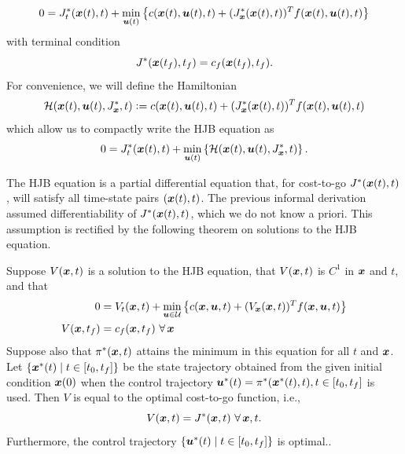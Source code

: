 \begin{equation}
    0 = J^*_t(\bm{x}(t),t) + \min_{\bm{u}(t)} \left\{ c(\bm{x}(t),\bm{u}(t),t) + (J_{\bm{x}}^*(\bm{x}(t),t))^T f(\bm{x}(t),\bm{u}(t),t) \right\}
\end{equation}
with terminal condition
\begin{equation}
    J^*(\bm{x}(t_f),t_f) = c_f(\bm{x}(t_f),t_f).
\end{equation}
For convenience, we will define the Hamiltonian 
\begin{equation}
    \mathcal{H}(\bm{x}(t),\bm{u}(t),J^*_{\bm{x}},t) \vcentcolon= c(\bm{x}(t),\bm{u}(t),t) + (J_{\bm{x}}^*(\bm{x}(t),t))^T f(\bm{x}(t),\bm{u}(t),t)
\end{equation}
which allow us to compactly write the HJB equation as 
\begin{equation}
    0 = J^*_t(\bm{x}(t),t) + \min_{\bm{u}(t)} \left\{ \mathcal{H}(\bm{x}(t),\bm{u}(t),J^*_{\bm{x}},t) \right\}.
\end{equation}

The HJB equation is a partial differential equation that, for cost-to-go $J^*(\bm{x}(t),t)$, will satisfy all time-state pairs $(\bm{x}(t),t)$. The previous informal derivation assumed differentiability of $J^*(\bm{x}(t),t)$, which we do not know a priori. This assumption is rectified by the following theorem on solutions to the HJB equation. 

\begin{theorem}
Suppose $V(\bm{x},t)$ is a solution to the HJB equation, that $V(\bm{x},t)$ is $C^1$ in $\bm{x}$ and $t$, and that
\begin{align*}
    0 &= V_t(\bm{x},t) + \min_{\bm{u} \in \mathcal{U}} \left\{ c(\bm{x},\bm{u},t) + (V_{\bm{x}}(\bm{x},t))^T f(\bm{x},\bm{u},t) \right\}\\
    V(\bm{x},t_f) &= c_f(\bm{x},t_f)\,\, \forall \, \bm{x}
\end{align*}
Suppose also that $\pi^*(\bm{x},t)$ attains the minimum in this equation for all $t$ and $\bm{x}$. Let $\{\bm{x}^*(t) \mid t \in [t_0, t_f]\}$ be the state trajectory obtained from the given initial condition $\bm{x}(0)$ when the control trajectory $\bm{u}^*(t) = \pi^*(\bm{x}^*(t),t), t \in [t_0, t_f]$ is used. Then $V$ is equal to the optimal cost-to-go function, i.e.,
\begin{equation}
    V(\bm{x},t) = J^*(\bm{x},t)\,\, \forall\, \bm{x}, t.
\end{equation}
Furthermore, the control trajectory $\{\bm{u}^*(t)\mid t \in [t_0, t_f]\}$ is optimal..
\end{theorem}

